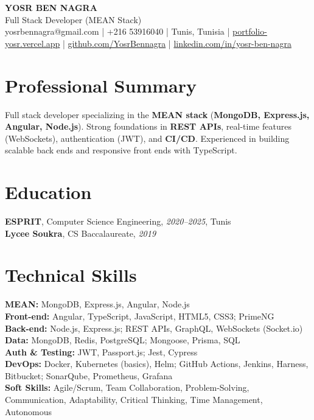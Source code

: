 \documentclass[10pt,a4paper]{article}
\begin{document}
\begin{center}
  {\Large\bfseries YOSR BEN NAGRA}\\[2pt]
  {\small Full Stack Developer (MEAN Stack)}\\[3pt]
  {\footnotesize yosrbennagra@gmail.com \;|\; +216 53916040 \;|\; Tunis, Tunisia \;|\; \href{https://portfolio-yosr.vercel.app/en}{portfolio-yosr.vercel.app} \;|\; \href{https://github.com/YosrBennagra}{github.com/YosrBennagra} \;|\; \href{https://www.linkedin.com/in/yosr-ben-nagra/}{linkedin.com/in/yosr-ben-nagra}}
\end{center}

\section*{Professional Summary}
{\small
Full stack developer specializing in the \textbf{MEAN stack} (\textbf{MongoDB, Express.js, Angular, Node.js}). Strong foundations in \textbf{REST APIs}, real-time features (WebSockets), authentication (JWT), and \textbf{CI/CD}. Experienced in building scalable back ends and responsive front ends with TypeScript.
}

\vspace{4pt}

\section*{Education}
{\small
\textbf{ESPRIT}, Computer Science Engineering, \textit{2020--2025}, Tunis\\[1pt]
\textbf{Lycee Soukra}, CS Baccalaureate, \textit{2019}
}

\vspace{4pt}

\section*{Technical Skills}
{\small
\textbf{MEAN:} MongoDB, Express.js, Angular, Node.js\\[2pt]
\textbf{Front-end:} Angular, TypeScript, JavaScript, HTML5, CSS3; PrimeNG\\[2pt]
\textbf{Back-end:} Node.js, Express.js; REST APIs, GraphQL, WebSockets (Socket.io)\\[2pt]
\textbf{Data:} MongoDB, Redis, PostgreSQL; Mongoose, Prisma, SQL\\[2pt]
\textbf{Auth \& Testing:} JWT, Passport.js; Jest, Cypress\\[2pt]
\textbf{DevOps:} Docker, Kubernetes (basics), Helm; GitHub Actions, Jenkins, Harness, Bitbucket; SonarQube, Prometheus, Grafana\\[2pt]
\textbf{Soft Skills:} Agile/Scrum, Team Collaboration, Problem-Solving, Communication, Adaptability, Critical Thinking, Time Management, Autonomous
}
\end{document}
